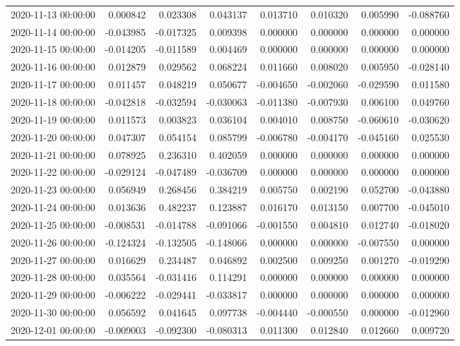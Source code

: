 \begin{tabular}{lrrrrrrr}
2020-11-13 00:00:00 & 0.000842 & 0.023308 & 0.043137 & 0.013710 & 0.010320 & 0.005990 & -0.088760 \\
2020-11-14 00:00:00 & -0.043985 & -0.017325 & 0.009398 & 0.000000 & 0.000000 & 0.000000 & 0.000000 \\
2020-11-15 00:00:00 & -0.014205 & -0.011589 & 0.004469 & 0.000000 & 0.000000 & 0.000000 & 0.000000 \\
2020-11-16 00:00:00 & 0.012879 & 0.029562 & 0.068224 & 0.011660 & 0.008020 & 0.005950 & -0.028140 \\
2020-11-17 00:00:00 & 0.011457 & 0.048219 & 0.050677 & -0.004650 & -0.002060 & -0.029590 & 0.011580 \\
2020-11-18 00:00:00 & -0.042818 & -0.032594 & -0.030063 & -0.011380 & -0.007930 & 0.006100 & 0.049760 \\
2020-11-19 00:00:00 & 0.011573 & 0.003823 & 0.036104 & 0.004010 & 0.008750 & -0.060610 & -0.030620 \\
2020-11-20 00:00:00 & 0.047307 & 0.054154 & 0.085799 & -0.006780 & -0.004170 & -0.045160 & 0.025530 \\
2020-11-21 00:00:00 & 0.078925 & 0.236310 & 0.402059 & 0.000000 & 0.000000 & 0.000000 & 0.000000 \\
2020-11-22 00:00:00 & -0.029124 & -0.047489 & -0.036709 & 0.000000 & 0.000000 & 0.000000 & 0.000000 \\
2020-11-23 00:00:00 & 0.056949 & 0.268456 & 0.384219 & 0.005750 & 0.002190 & 0.052700 & -0.043880 \\
2020-11-24 00:00:00 & 0.013636 & 0.482237 & 0.123887 & 0.016170 & 0.013150 & 0.007700 & -0.045010 \\
2020-11-25 00:00:00 & -0.008531 & -0.014788 & -0.091066 & -0.001550 & 0.004810 & 0.012740 & -0.018020 \\
2020-11-26 00:00:00 & -0.124324 & -0.132505 & -0.148066 & 0.000000 & 0.000000 & -0.007550 & 0.000000 \\
2020-11-27 00:00:00 & 0.016629 & 0.234487 & 0.046892 & 0.002500 & 0.009250 & 0.001270 & -0.019290 \\
2020-11-28 00:00:00 & 0.035564 & -0.031416 & 0.114291 & 0.000000 & 0.000000 & 0.000000 & 0.000000 \\
2020-11-29 00:00:00 & -0.006222 & -0.029441 & -0.033817 & 0.000000 & 0.000000 & 0.000000 & 0.000000 \\
2020-11-30 00:00:00 & 0.056592 & 0.041645 & 0.097738 & -0.004440 & -0.000550 & 0.000000 & -0.012960 \\
2020-12-01 00:00:00 & -0.009003 & -0.092300 & -0.080313 & 0.011300 & 0.012840 & 0.012660 & 0.009720 \\

\end{tabular}
